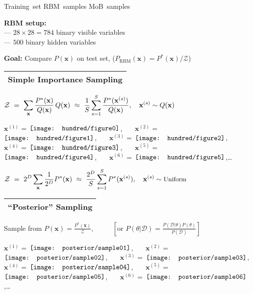 \documentclass[25pt,landscape]{foils}
\newcommand{\Gray}{\textcolor{mygray}}
\newcommand{\myfoilhead}[1]{
\newpage
\vspace*{-1cm}
\Gray{
\begin{tabular*}{\textwidth}{l}
{\bf \Huge #1} \\
\bottomrule
\end{tabular*}}}
\newcommand{\sth}{^{(s)}}
\newcommand{\bx}{\mathbf{x}}
\newcommand{\D}{\mathcal{D}}
\newcommand{\Z}{\mathcal{Z}}
\newcommand{\myvcenter}[1]{\ensuremath{\vcenter{\hbox{#1}}}} %
\begin{document}
\hspace*{2.0cm}\hbox{Training set}
\hspace*{3.5cm}\hbox{RBM samples}
\hspace*{3.0cm}\hbox{MoB samples}

\vfill
\textbf{RBM setup:}\\
\hspace*{2cm}--- $28\times 28 = 784$ binary visible variables\\
\hspace*{2cm}--- $500$ binary hidden variables

\bigskip

\textbf{Goal:} Compare $P(\bx)$ on test set, ($P_\text{RBM}(\bx)=P^*(\bx)/\Z$)

\myfoilhead{Simple Importance Sampling}

\vspace*{1.5cm}

$\displaystyle \Z
~=~
\sum_\bx \frac{P^*(\bx)}{Q(\bx)}\,Q(\bx)
~\approx~
\frac{1}{S} \sum_{s=1}^S \frac{P^*(\bx\sth)}{Q(\bx)},\quad {\small \bx\sth\sim Q(\bx)}
$

\vfill

$\bx^{(1)}\!=\,$\myvcenter{\texttt{[image: hundred/figure0]}},~~~
$\bx^{(2)}\!=\,$\myvcenter{\texttt{[image: hundred/figure1]}},~~~
$\bx^{(3)}\!=\,$\myvcenter{\texttt{[image: hundred/figure2]}},\\[0.3in]
$\bx^{(4)}\!=\,$\myvcenter{\texttt{[image: hundred/figure3]}},~~~
$\bx^{(5)}\!=\,$\myvcenter{\texttt{[image: hundred/figure4]}},~~~
$\bx^{(6)}\!=\,$\myvcenter{\texttt{[image: hundred/figure5]}},\dots

\vfill
\Gray{$\displaystyle \Z
~=~
2^D \sum_{\bx} \frac{1}{2^D} P^*(\bx)
~\approx~
\frac{2^D}{S} \sum_{s=1}^S P^*(\bx\sth),\quad {\small \bx\sth\sim \text{Uniform}}$}

\myfoilhead{``Posterior'' Sampling}

\vfill

Sample from $\displaystyle P(\bx) = \frac{P^*(\bx)}{\Z}$,~~~~~
\Gray{\small $\displaystyle \left[\text{or~}P(\theta|\D) = \frac{P(\D|\theta)P(\theta)}{P(\D)}\right]$}

\vfill

$\bx^{(1)}\!=\,$\myvcenter{\texttt{[image: posterior/sample01]}},~~~
$\bx^{(2)}\!=\,$\myvcenter{\texttt{[image: posterior/sample02]}},~~~
$\bx^{(3)}\!=\,$\myvcenter{\texttt{[image: posterior/sample03]}},\\[0.3in]
$\bx^{(4)}\!=\,$\myvcenter{\texttt{[image: posterior/sample04]}},~~~
$\bx^{(5)}\!=\,$\myvcenter{\texttt{[image: posterior/sample05]}},~~~
$\bx^{(6)}\!=\,$\myvcenter{\texttt{[image: posterior/sample06]}},\dots
\end{document}
